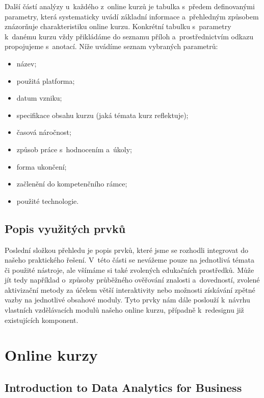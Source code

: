 Další částí analýzy u~každého z~online kurzů je tabulka s~předem definovanými parametry, která systematicky uvádí základní informace a~přehledným způsobem znázorňuje charakteristiku online kurzu. Konkrétní tabulku s~parametry k~danému kurzu vždy přikládáme do seznamu příloh a~prostřednictvím odkazu propojujeme s~anotací. Níže uvádíme seznam vybraných parametrů:

\begin{itemize}
\tightlist
\item
  název;
\item
  použitá platforma;
\item
  datum vzniku;
\item
  specifikace obsahu kurzu (jaká témata kurz reflektuje);
\item
  časová náročnost;
\item
  způsob práce s~hodnocením a~úkoly;
\item
  forma ukončení;
\item
  začlenění do kompetenčního rámce;
\item
  použité technologie.
\end{itemize}

\hypertarget{popis-vyuux17eituxfdch-prvkux16f}{%
\subsection{Popis využitých prvků}\label{popis-vyuux17eituxfdch-prvkux16f}}

Poslední složkou přehledu je popis prvků, které jsme se rozhodli integrovat do našeho praktického řešení. V~této části se nevážeme pouze na jednotlivá témata či použité nástroje, ale všímáme si také zvolených edukačních prostředků. Může jít tedy například o~způsoby průběžného ověřování znalosti a~dovedností, zvolené aktivizační metody za účelem větší interaktivity nebo možnosti získávání zpětné vazby na jednotlivé obsahové moduly. Tyto prvky nám dále poslouží k~návrhu vlastních vzdělávacích modulů našeho online kurzu, případně k~redesignu již existujících komponent.

\hypertarget{online-kurzy}{%
\section{Online kurzy}\label{online-kurzy}}

\hypertarget{introduction-to-data-analytics-for-business}{%
\subsection{Introduction to Data Analytics for Business}\label{introduction-to-data-analytics-for-business}}

